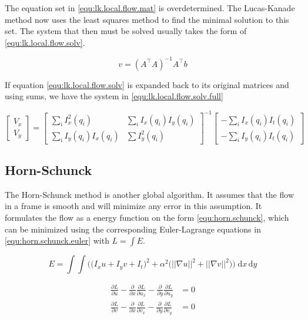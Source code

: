 The equation set in \eqref{equ:lk.local.flow.mat} is overdetermined. The Lucas-Kanade method now uses the 
least squares method to find the minimal solution to this set. The system that then must be solved usually takes the 
form of \eqref{equ:lk.local.flow.solv}.

\begin{equation}\label{equ:lk.local.flow.solv}
	v = \left(A^\top A\right)^{-1} A^\top b
\end{equation}

If equation \eqref{equ:lk.local.flow.solv} is expanded back to its original matrices and using sums, we have the system in \eqref{equ:lk.local.flow.solv.full}

\begin{equation}\label{equ:lk.local.flow.solv.full}
	\begin{bmatrix}
		V_x \\ V_y
	\end{bmatrix} = 
	\begin{bmatrix}
		\sum_ i{I_x^2(q_i)} 	 & \sum_i{I_x(q_i)I_y(q_i)} \\
		\sum_i{I_y(q_i)I_x(q_i)} & \sum{I_y^2(q_i)}
	\end{bmatrix}^{-1}
	\begin{bmatrix}
		-\sum_i{I_x(q_i)I_t(q_i)} \\ -\sum_i{I_y(q_i)I_t(q_i)}
	\end{bmatrix}
\end{equation}

\subsection{Horn-Schunck}\label{sec:horn-schunck}
The Horn-Schunck method is another global algorithm\citet{horn80}. It assumes that the flow in a frame is smooth and will minimize any error in this assumption.
It formulates the flow as a energy function on the form \eqref{equ:horn.schunck}, which can be minimized using the corresponding Euler-Lagrange equations in \eqref{equ:horn.schunck.euler} with
$L=\int{E}$.

\begin{equation}\label{equ:horn.schunck}
	E = \int \int \Big ( \big (I_x u + I_y v + I_t\big )^2 + \alpha^2\big (||\nabla u||^2 + ||\nabla v||^2\big ) \Big )\; \mathrm{d}x\,\mathrm{d}y
\end{equation}

\begin{equation}\label{equ:horn.schunck.euler}
	\begin{split}
		\frac{\partial L}{\partial u} - \frac{\partial}{\partial x}\frac{\partial L}{\partial u_x} - \frac{\partial}{\partial y}\frac{\partial L}{\partial u_y} &= 0 \\
		\frac{\partial L}{\partial v} - \frac{\partial}{\partial x}\frac{\partial L}{\partial v_x} - \frac{\partial}{\partial y}\frac{\partial L}{\partial v_y} &= 0
	\end{split}
\end{equation}

